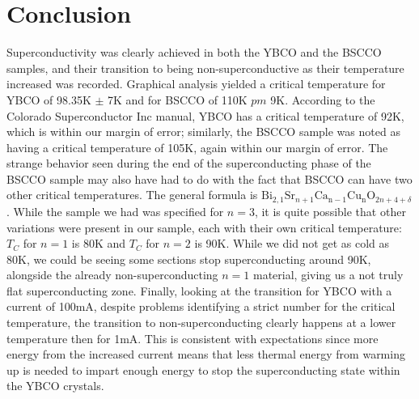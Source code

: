 \documentclass[prb,preprint]{revtex4-1}
\begin{document}
\section{Conclusion}

Superconductivity was clearly achieved in both the YBCO and the BSCCO samples, and their transition to being non-superconductive as their temperature increased was recorded. Graphical analysis yielded a critical temperature for YBCO of 98.35K $\pm$ 7K and for BSCCO of 110K $pm$ 9K. According to the Colorado Superconductor Inc manual, YBCO has a critical temperature of 92K, which is within our margin of error; similarly, the BSCCO sample was noted as having a critical temperature of 105K, again within our margin of error. The strange behavior seen during the end of the superconducting phase of the BSCCO sample may also have had to do with the fact that BSCCO can have two other critical temperatures. The general formula is $\text{Bi}_{2,1}\text{Sr}_{n+1}\text{Ca}_{\text{n}-1}\text{Cu}_{\text{n}}\text{O}_{2n+4+\delta}$. While the sample we had was specified for $n=3$, it is quite possible that other variations were present in our sample, each with their own critical temperature: $T_C$ for $n=1$ is 80K and $T_C$ for $n=2$ is 90K. \cite{colo} While we did not get as cold as 80K, we could be seeing some sections stop superconducting around 90K, alongside the already non-superconducting $n=1$ material, giving us a not truly flat superconducting zone. Finally, looking at the transition for YBCO with a current of 100mA, despite problems identifying a strict number for the critical temperature, the transition to non-superconducting clearly happens at a lower temperature then for 1mA. This is consistent with expectations since more energy from the increased current means that less thermal energy from warming up is needed to impart enough energy to stop the superconducting state within the YBCO crystals.
\end{document}
